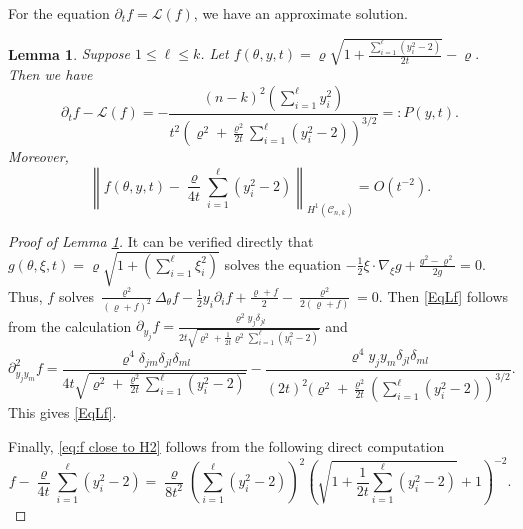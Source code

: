 \documentclass[11pt]{amsart}
\numberwithin{equation}{section}
\newtheorem{lemma}[theorem]{Lemma}
\numberwithin{equation}{section}
\newcommand{\cC}{\mathcal{C}}
\newcommand{\sL}{\mathscr{L}}
\newcommand{\pr}{\partial}
\begin{document}
	For the equation $\partial_t f=\mathscr L (f)$, we have an approximate solution. 
	\begin{lemma}\label{Lmf} Suppose $1\leq \ell\leq k$. Let	$
		f(\theta,y,t)
		=
		\varrho\sqrt{1+\frac{\sum_{i=1}^\ell (y_i^2-2)}{2t}}-\varrho.$ Then we have 	\begin{equation}\label{EqLf}
			\pr_t f - \sL (f)=
			-\frac{(n-k)^2(\sum_{i=1}^\ell y_i^2)}{t^2(\varrho^2+\frac{\varrho^2}{2t}\sum_{i=1}^\ell(y_i^2-2))^{3/2}}=:P(y,t).
		\end{equation}
		Moreover,
		\begin{equation}\label{eq:f close to H2}
			\left\|f(\theta,y,t)-\frac{\varrho}{4t}\sum_{i=1}^\ell (y_i^2-2)\right\|_{H^1(\cC_{n,k})}
			=
			O(t^{-2}).
		\end{equation}
	\end{lemma}
	
	\begin{proof}[Proof of Lemma \ref{Lmf}]
		It can be verified directly that   $g(\theta,\xi,t)=\varrho\sqrt{1+(\sum_{i=1}^\ell\xi_i^2)}$ solves the equation $-\frac{1}{2}\xi\cdot\nabla_\xi g+\frac{g^2-\varrho^2}{2g}=0$. Thus, $f$ solves  $\frac{\varrho^2}{(\varrho+f)^2}\Delta_\theta f-\frac12y_i\pr_i f
		+\frac{\varrho+f}{2}
		-\frac{\varrho^2}{2(\varrho+f)}=0$. 
		Then \eqref{EqLf} follows from the calculation
		$	\pr_{y_j} f=\frac{\varrho^2y_j\delta_{jl}}{2t\sqrt{\varrho^2+\frac{1}{2t}\varrho^2\sum_{i=1}^\ell (y_i^2-2)}}$ and 
		\[
		\pr^2_{y_jy_m} f
		=
		\frac{\varrho^4\delta_{jm}\delta_{jl}\delta_{ml}}{4t\sqrt{\varrho^2+\frac{\varrho^2}{2t}\sum_{i=1}^\ell (y_i^2-2)}}
		-
		\frac{\varrho^4y_jy_m\delta_{jl}\delta_{ml}}{(2t)^2(\varrho^2+\frac{\varrho^2}{2t}(\sum_{i=1}^\ell (y_i^2-2))^{3/2}}.
		\]
		This gives \eqref{EqLf}. 
		
		Finally, \eqref{eq:f close to H2} follows from the following direct computation
		\begin{equation}\label{eq:f-H2}
			f-\frac{\varrho}{4t}\sum_{i=1}^\ell (y_i^2-2)=
			\frac{\varrho}{8t^2}(\sum_{i=1}^\ell (y_i^2-2))^2
			\left(\sqrt{1+\frac{1}{2t}\sum_{i=1}^\ell (y_i^2-2)}+1\right)^{-2}.
		\end{equation}
	\end{proof}
	
\end{document}
